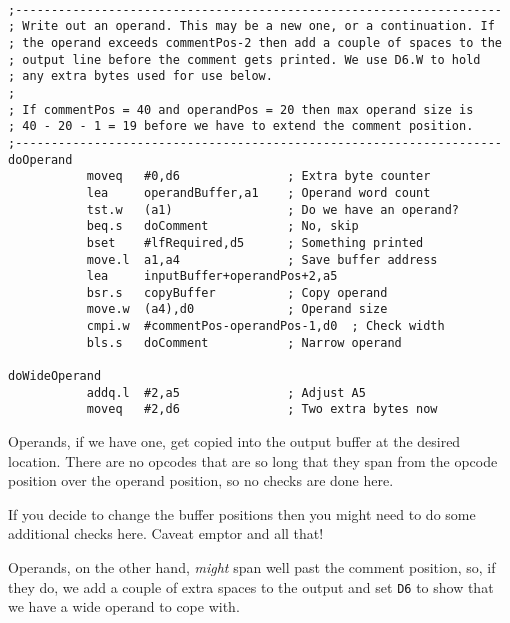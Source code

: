 \begin{lstlisting}[firstnumber=last,caption={ASMReformat Source - Writing Operands}]

;--------------------------------------------------------------------
; Write out an operand. This may be a new one, or a continuation. If
; the operand exceeds commentPos-2 then add a couple of spaces to the
; output line before the comment gets printed. We use D6.W to hold
; any extra bytes used for use below.
;
; If commentPos = 40 and operandPos = 20 then max operand size is
; 40 - 20 - 1 = 19 before we have to extend the comment position.
;--------------------------------------------------------------------
doOperand
           moveq   #0,d6               ; Extra byte counter
           lea     operandBuffer,a1    ; Operand word count
           tst.w   (a1)                ; Do we have an operand?
           beq.s   doComment           ; No, skip
           bset    #lfRequired,d5      ; Something printed
           move.l  a1,a4               ; Save buffer address
           lea     inputBuffer+operandPos+2,a5  
           bsr.s   copyBuffer          ; Copy operand
           move.w  (a4),d0             ; Operand size
           cmpi.w  #commentPos-operandPos-1,d0  ; Check width
           bls.s   doComment           ; Narrow operand

doWideOperand
           addq.l  #2,a5               ; Adjust A5
           moveq   #2,d6               ; Two extra bytes now
\end{lstlisting}

Operands, if we have one, get copied into the output buffer at the desired location. There are no opcodes that are so long that they span from the opcode position over the operand position, so no checks are done here.

If you decide to change the buffer positions then you might need to do some additional checks here. Caveat emptor and all that!

Operands, on the other hand, \emph{might} span well past the comment position, so, if they do, we add a couple of extra spaces to the output and set \texttt{D6} to show that we have a wide operand to cope with.

